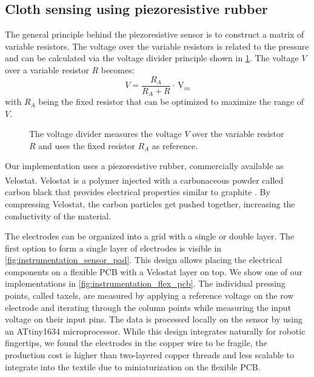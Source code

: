 \documentclass[\home/main.tex]{subfiles}
\begin{document}
\subsection{Cloth sensing using piezoresistive rubber}

The general principle behind the piezoresistive sensor is to construct a matrix of variable resistors. The voltage over the variable resistors is related to the pressure and can be calculated via the voltage divider principle shown in \cref{fig:instrumentation_voltage_divider}. The voltage $V$ over a variable resistor $R$ becomes:
\begin{equation}
    V=\frac{R_{A}}{R_{A}+R} \cdot \mathrm{~V}_{in}
\end{equation}
with $R_A$ being the fixed resistor that can be optimized to maximize the range of $V$.
\begin{figure}[htpb]
    \centering
    
    \caption{The voltage divider measures the voltage $V$ over the variable resistor $R$ and uses the fixed resistor $R_A$ as reference.}
    \label{fig:instrumentation_voltage_divider}
\end{figure}

Our implementation uses a piezoresistive rubber, commercially available as Velostat\textsuperscript{\textregistered}. Velostat is a polymer injected with a carbonaceous powder called carbon black that provides electrical properties similar to graphite \autocite{Dzedzickis2020}. By compressing Velostat, the carbon particles get pushed together, increasing the conductivity of the material.

The electrodes can be organized into a grid with a single or double layer.
The first option to form a single layer of electrodes is visible in \cref{fig:instrumentation_sensor_pad}. This design allows placing the electrical components on a flexible PCB with a Velostat layer on top. We show one of our implementations in \cref{fig:instrumentation_flex_pcb}. The individual pressing points, called taxels, are measured by applying a reference voltage on the row electrode and iterating through the column points while measuring the input voltage on their input pins. The data is processed locally on the sensor by using an ATtiny1634 microprocessor. While this design integrates naturally for robotic fingertips, we found the electrodes in the copper wire to be fragile, the production cost is higher than two-layered copper threads and less scalable to integrate into the textile due to miniaturization on the flexible PCB.
\end{document}
